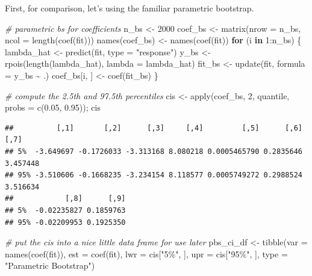 \documentclass[
]{book}
\newenvironment{Shaded}{\begin{snugshade}}{\end{snugshade}}
\newcommand{\AttributeTok}[1]{\textcolor[rgb]{0.77,0.63,0.00}{#1}}
\newcommand{\CommentTok}[1]{\textcolor[rgb]{0.56,0.35,0.01}{\textit{#1}}}
\newcommand{\ControlFlowTok}[1]{\textcolor[rgb]{0.13,0.29,0.53}{\textbf{#1}}}
\newcommand{\DecValTok}[1]{\textcolor[rgb]{0.00,0.00,0.81}{#1}}
\newcommand{\FloatTok}[1]{\textcolor[rgb]{0.00,0.00,0.81}{#1}}
\newcommand{\FunctionTok}[1]{\textcolor[rgb]{0.00,0.00,0.00}{#1}}
\newcommand{\NormalTok}[1]{#1}
\newcommand{\OtherTok}[1]{\textcolor[rgb]{0.56,0.35,0.01}{#1}}
\newcommand{\SpecialCharTok}[1]{\textcolor[rgb]{0.00,0.00,0.00}{#1}}
\newcommand{\StringTok}[1]{\textcolor[rgb]{0.31,0.60,0.02}{#1}}
\begin{document}
First, for comparison, let's using the familiar parametric bootstrap.

\begin{Shaded}
\begin{Highlighting}[]
\CommentTok{\# parametric bs for coefficients}
\NormalTok{n\_bs }\OtherTok{\textless{}{-}} \DecValTok{2000}
\NormalTok{coef\_bs }\OtherTok{\textless{}{-}} \FunctionTok{matrix}\NormalTok{(}\AttributeTok{nrow =}\NormalTok{ n\_bs, }\AttributeTok{ncol =} \FunctionTok{length}\NormalTok{(}\FunctionTok{coef}\NormalTok{(fit)))}
\FunctionTok{names}\NormalTok{(coef\_bs) }\OtherTok{\textless{}{-}} \FunctionTok{names}\NormalTok{(}\FunctionTok{coef}\NormalTok{(fit))}
\ControlFlowTok{for}\NormalTok{ (i }\ControlFlowTok{in} \DecValTok{1}\SpecialCharTok{:}\NormalTok{n\_bs) \{}
\NormalTok{  lambda\_hat }\OtherTok{\textless{}{-}} \FunctionTok{predict}\NormalTok{(fit, }\AttributeTok{type =} \StringTok{"response"}\NormalTok{)}
\NormalTok{  y\_bs }\OtherTok{\textless{}{-}} \FunctionTok{rpois}\NormalTok{(}\FunctionTok{length}\NormalTok{(lambda\_hat), }\AttributeTok{lambda =}\NormalTok{ lambda\_hat)}
\NormalTok{  fit\_bs }\OtherTok{\textless{}{-}} \FunctionTok{update}\NormalTok{(fit, }\AttributeTok{formula =}\NormalTok{ y\_bs }\SpecialCharTok{\textasciitilde{}}\NormalTok{ .)}
\NormalTok{  coef\_bs[i, ] }\OtherTok{\textless{}{-}} \FunctionTok{coef}\NormalTok{(fit\_bs)}
\NormalTok{\}}

\CommentTok{\# compute the 2.5th and 97.5th percentiles}
\NormalTok{cis }\OtherTok{\textless{}{-}} \FunctionTok{apply}\NormalTok{(coef\_bs, }\DecValTok{2}\NormalTok{, quantile, }\AttributeTok{probs =} \FunctionTok{c}\NormalTok{(}\FloatTok{0.05}\NormalTok{, }\FloatTok{0.95}\NormalTok{)); cis}
\end{Highlighting}
\end{Shaded}

\begin{verbatim}
##          [,1]       [,2]      [,3]     [,4]         [,5]      [,6]     [,7]
## 5%  -3.649697 -0.1726033 -3.313168 8.080218 0.0005465790 0.2835646 3.457448
## 95% -3.510606 -0.1668235 -3.234154 8.118577 0.0005749272 0.2988524 3.516634
##            [,8]      [,9]
## 5%  -0.02235827 0.1859763
## 95% -0.02209953 0.1925350
\end{verbatim}

\begin{Shaded}
\begin{Highlighting}[]
\CommentTok{\# put the cis into a nice little data frame for use later}
\NormalTok{pbs\_ci\_df }\OtherTok{\textless{}{-}} \FunctionTok{tibble}\NormalTok{(}\AttributeTok{var =} \FunctionTok{names}\NormalTok{(}\FunctionTok{coef}\NormalTok{(fit)),}
                \AttributeTok{est =} \FunctionTok{coef}\NormalTok{(fit),}
                \AttributeTok{lwr =}\NormalTok{ cis[}\StringTok{"5\%"}\NormalTok{, ],}
                \AttributeTok{upr =}\NormalTok{ cis[}\StringTok{"95\%"}\NormalTok{, ], }
                \AttributeTok{type =} \StringTok{"Parametric Bootstrap"}\NormalTok{)}
\end{Highlighting}
\end{Shaded}
\end{document}
